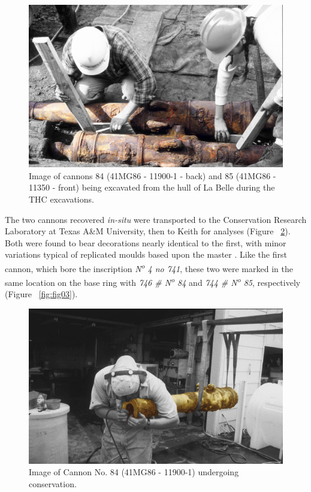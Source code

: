 \documentclass[review]{elsarticle}
\begin{document}
\begin{figure}[ht]\centering
\includegraphics[width=\linewidth]{fig01.jpg}
\caption{Image of cannons 84 (41MG86 - 11900-1 - back) and 85 (41MG86 - 11350 - front) being excavated from the hull of La Belle during the THC excavations.}
\label{fig:fig01}
\end{figure}

The two cannons recovered \textit{in-situ} were transported to the Conservation Research Laboratory at Texas A\&M University, then to Keith for analyses (Figure ~\ref{fig:fig02}). Both were found to bear decorations nearly identical to the first, with minor variations typical of replicated moulds based upon the master \citep[361]{RN5763}. Like the first cannon, which bore the inscription \textit{N\textsuperscript{o} 4 no 741}, these two were marked in the same location on the base ring with \textit{746 \# N\textsuperscript{o} 84} and \textit{744 \# N\textsuperscript{o} 85}, respectively (Figure ~\ref{fig:fig03}).

\begin{figure}[ht]\centering
\includegraphics[width=\linewidth]{fig02.jpg}
\caption{Image of Cannon No. 84 (41MG86 - 11900-1) undergoing conservation.}
\label{fig:fig02}
\end{figure}
\end{document}
